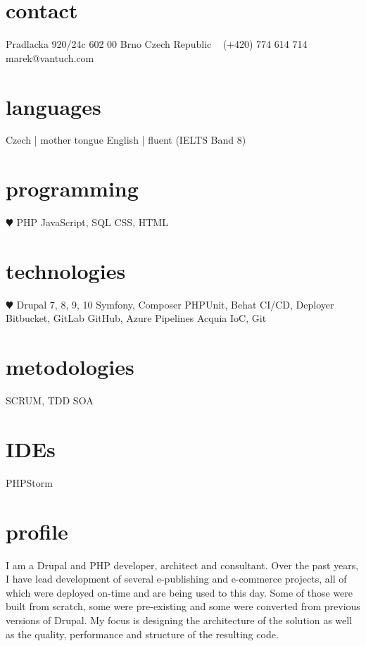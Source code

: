\documentclass[]{friggeri-cv} %
\begin{document}


\begin{aside} %
\section{contact}
Pradlacka 920/24c
602 00 Brno
Czech Republic
~
(+420) 774 614 714
~
marek@vantuch.com
\section{languages}
Czech | mother tongue
English | fluent
(IELTS Band 8)
\section{programming}
{\color{red} $\varheartsuit$} PHP
JavaScript, SQL
CSS, HTML
\section{technologies}
{\color{red} $\varheartsuit$} Drupal 7, 8, 9, 10
Symfony, Composer
PHPUnit, Behat
CI/CD, Deployer
Bitbucket, GitLab
GitHub, Azure Pipelines
Acquia
IoC, Git
\section{metodologies}
SCRUM, TDD
SOA
\section{IDEs}
PHPStorm
\end{aside}

\section{profile}
I am a Drupal and PHP developer, architect and consultant.
Over the past years, I have lead development of several e-publishing and e-commerce projects, all of which were deployed on-time and are being used to this day.
Some of those were built from scratch, some were pre-existing and some were converted from previous versions of Drupal.
My focus is designing the architecture of the solution as well as the quality, performance and structure of the resulting code.
\end{document}
